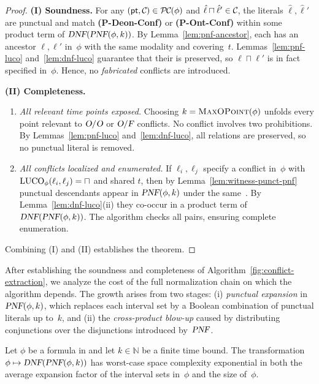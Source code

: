 \begin{proof}
\textbf{(I) Soundness.}  
For any $(\pt,\mathcall{C})\in\mathcall{PC}(\phi)$ and $\hat\ell\sqcap\hat\ell'\in\mathcall{C}$,
the literals $\hat\ell,\hat\ell'$ are punctual and match
\textbf{(P-Deon-Conf)} or \textbf{(P-Ont-Conf)} within some product term of
$\textsl{DNF}(\textsl{PNF}(\phi,k))$.  
By Lemma~\ref{lem:pnf-ancestor}, each has an ancestor $\ell,\ell'$ in~$\phi$ with the
same modality and covering~$t$.  
Lemmas~\ref{lem:pnf-luco} and~\ref{lem:dnf-luco} guarantee that their \LUCO is preserved,
so $\ell\sqcap\ell'$ is in fact specified in~$\phi$.
Hence, no \emph{fabricated} conflicts are introduced.

\smallskip
\textbf{(II) Completeness.}  
\begin{enumerate}[(1)]
\item \emph{All relevant time points exposed.}  
Choosing $k=\textsc{MaxOPoint}(\phi)$ unfolds every point relevant to
$\textsl{O}/\textsl{O}$ or $\textsl{O}/\textsl{F}$ conflicts.  
No conflict involves two prohibitions.  
By Lemmas~\ref{lem:pnf-luco} and~\ref{lem:dnf-luco}, all \LUCO relations are preserved, so no punctual literal is removed.

\item \emph{All conflicts localized and enumerated.}  
If $\ell_i,\ell_j$ specify a conflict in~$\phi$ with
$\mathrm{LUCO}_\phi(\ell_i,\ell_j)=\sqcap$ and shared $t$, then by
Lemma~\ref{lem:witness-punct-pnf} punctual descendants appear in $\textsl{PNF}(\phi,k)$
under the same~\LUCO.  
By Lemma~\ref{lem:dnf-luco}(ii) they co-occur in a product term of
$\textsl{DNF}(\textsl{PNF}(\phi,k))$. The algorithm checks all pairs, ensuring complete enumeration.
\end{enumerate}
Combining (I) and (II) establishes the theorem.
\end{proof}

After establishing the soundness and completeness of
Algorithm~\ref{fig:conflict-extraction}, we analyze the cost of the full normalization chain
on which the algorithm depends. The growth arises from two stages:
(i) \emph{punctual expansion} in $\textsl{PNF}(\phi,k)$, which replaces each interval set by a Boolean
combination of punctual literals up to~$k$, and
(ii) the \emph{cross-product blow-up} caused by distributing conjunctions over the disjunctions
introduced by~$\textsl{PNF}$.

\begin{theorem}\label{complexityofconf}
Let $\phi$ be a formula in \TDDLfm and let $k\in\mathbb{N}$ be a finite time bound.
The transformation $\phi\mapsto\textsl{DNF}(\textsl{PNF}(\phi,k))$ has worst-case space complexity
exponential in both the average expansion factor of the interval sets in~$\phi$
and the size of~$\phi$.
\end{theorem}


